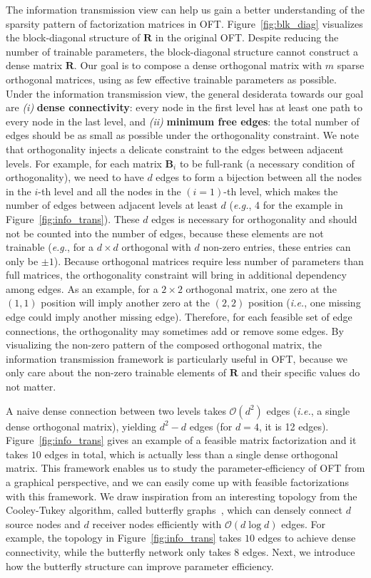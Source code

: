 The information transmission view can help us gain a better understanding of the sparsity pattern of factorization matrices in OFT. Figure~\ref{fig:blk_diag} visualizes the block-diagonal structure of $\bm{R}$ in the original OFT. Despite reducing the number of trainable parameters, the block-diagonal structure cannot construct a dense matrix $\bm{R}$. Our goal is to compose a dense orthogonal matrix with $m$ sparse orthogonal matrices, using as few effective trainable parameters as possible. Under the information transmission view, the general desiderata towards our goal are \emph{(i)} \textbf{dense connectivity}: every node in the first level has at least one path to every node in the last level, and \emph{(ii)} \textbf{minimum free edges}: the total number of edges should be as small as possible under the orthogonality constraint. We note that orthogonality injects a delicate constraint to the edges between adjacent levels. For example, for each matrix $\bm{B}_i$ to be full-rank (a necessary condition of orthogonality), we need to have $d$ edges to form a bijection between all the nodes in the $i$-th level and all the nodes in the $(i=1)$-th level, which makes the number of edges between adjacent levels at least $d$ (\emph{e.g.}, 4 for the example in Figure~\ref{fig:info_trans}). These $d$ edges is necessary for orthogonality and should not be counted into the number of edges, because these elements are not trainable (\emph{e.g.}, for a $d\times d$ orthogonal with $d$ non-zero entries, these entries can only be $\pm 1$). Because orthogonal matrices require less number of parameters than full matrices, the orthogonality constraint will bring in additional dependency among edges. As an example, for a $2\times 2$ orthogonal matrix, one zero at the $(1,1)$ position will imply another zero at the $(2,2)$ position (\emph{i.e.}, one missing edge could imply another missing edge). Therefore, for each feasible set of edge connections, the orthogonality may sometimes add or remove some edges. By visualizing the non-zero pattern of the composed orthogonal matrix, the information transmission framework is particularly useful in OFT, because we only care about the non-zero trainable elements of $\bm{R}$ and their specific values do not matter.

A naive dense connection between two levels takes $\mathcal{O}(d^2)$ edges (\emph{i.e.}, a single dense orthogonal matrix), yielding $d^2-d$ edges (for $d=4$, it is 12 edges). Figure~\ref{fig:info_trans} gives an example of a feasible matrix factorization and it takes $10$ edges in total, which is actually less than a single dense orthogonal matrix. This framework enables us to study the parameter-efficiency of OFT from a graphical perspective, and we can easily come up with feasible factorizations with this framework. We draw inspiration from an interesting topology from the Cooley-Tukey algorithm, called butterfly graphs~\cite{cooley1965algorithm}, which can densely connect $d$ source nodes and $d$ receiver nodes efficiently with $\mathcal{O}(d\log d)$ edges. For example, the topology in Figure~\ref{fig:info_trans} takes $10$ edges to achieve dense connectivity, while the butterfly network only takes $8$ edges. Next, we introduce how the butterfly structure can improve parameter efficiency.

